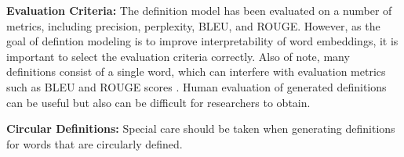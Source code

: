 \textbf{Evaluation Criteria:} The definition model has been evaluated on a
number of metrics, including precision, perplexity, BLEU, and ROUGE. However,
as the goal of defintion modeling is to improve interpretability of word
embeddings, it is important to select the evaluation criteria correctly. Also of
note, many definitions consist of a single word, which can interfere with
evaluation metrics such as BLEU and ROUGE scores \cite{mickus_mark_2019}. Human
evaluation of generated definitions can be useful but also can be difficult for
researchers to obtain.

\textbf{Circular Definitions:} Special care should be taken when generating
definitions for words that are circularly defined.